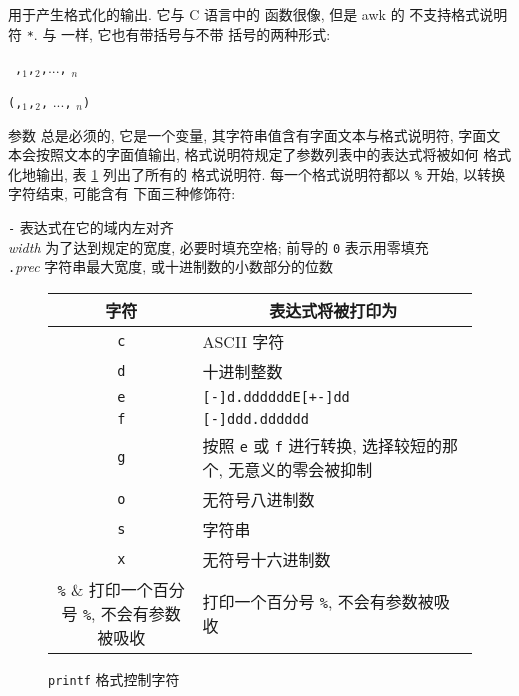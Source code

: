 \printf 用于产生格式化的输出. 它与 C 语言中的 \printf 函数很像, 但是 awk
的 \printf 不支持格式说明符 \verb'*'. 与 \print 一样, 它也有带括号与不带
括号的两种形式:
\begin{pattern}
    \printf\ \fmt\verb','\expr$_1$\verb','\expr$_2$\verb','...\verb','
    \expr$_n$ \par
    \printf\verb'('\fmt\verb','\expr$_1$\verb','\expr$_2$\verb','
    ...\verb',' \expr$_n$\verb')'
\end{pattern}
参数 \fmt 总是必须的, 它是一个变量, 其字符串值含有字面文本与格式说明符,
字面文本会按照文本的字面值输出, 格式说明符规定了参数列表中的表达式将被如何
格式化地输出, 表 \ref{tbl:printf_format_control_characters} 列出了所有的
格式说明符. 每一个格式说明符都以 \verb'%' 开始, 以转换字符结束, 可能含有
下面三种修饰符:
\begin{tabbing}
    \indent\verb'-' \hspace{4em} \= 表达式在它的域内左对齐 \\
    \indent\textit{width}  \> 为了达到规定的宽度, 必要时填充空格; 前导的 \verb'0'
    表示用零填充 \\
    \indent\verb'.'\textit{prec}   \> 字符串最大宽度, 或十进制数的小数部分的位数
\end{tabbing}
\begin{figure}
        \captionsetup{type=table}
        \caption{\texttt{printf} 格式控制字符}
        \label{tbl:printf_format_control_characters}
\begin{center}
        \begin{tabular}{c|l}
            \hline
            \hline
            字符    & \multicolumn{1}{c}{表达式将被打印为} \\
            \hline
            \verb'c' & ASCII 字符 \\
            \verb'd' & 十进制整数 \\
            \verb'e' & \verb'[-]d.ddddddE[+-]dd' \\
            \verb'f' & \verb'[-]ddd.dddddd' \\
            \verb'g' & 按照 \verb'e' 或 \verb'f' 进行转换, 选择较短的那个,
                无意义的零会被抑制 \\
            \verb'o' & 无符号八进制数 \\
            \verb's' & 字符串 \\
            \verb'x' & 无符号十六进制数 \\
            \verb'%' & 打印一个百分号 \verb'%', 不会有参数被吸收 \\
            \hline
        \end{tabular}
\end{center}
    \end{figure}
